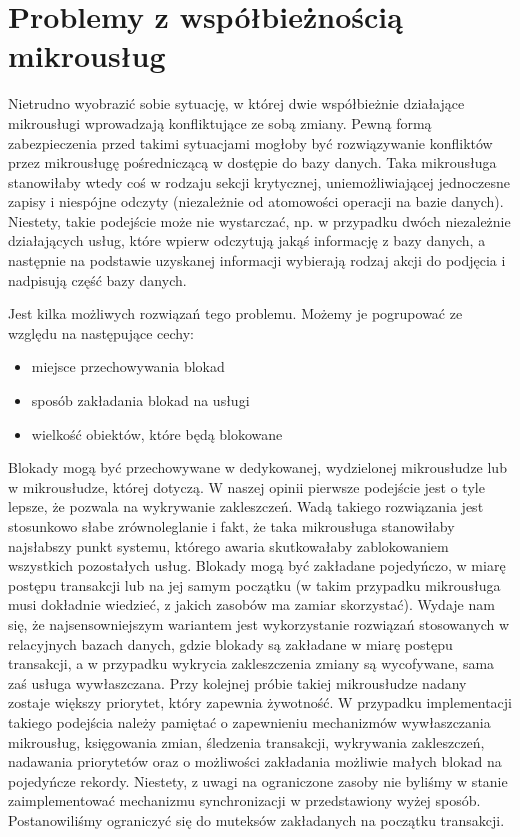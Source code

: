 \documentclass[licencjacka]{pracamgr}
\begin{document}
\section{Problemy z współbieżnością mikrousług}

Nietrudno wyobrazić sobie sytuację, w której dwie współbieżnie działające mikrousługi
wprowadzają konfliktujące ze sobą zmiany. Pewną formą zabezpieczenia przed takimi sytuacjami
mogłoby być rozwiązywanie konfliktów przez mikrousługę pośredniczącą w dostępie do bazy danych.
Taka mikrousługa stanowiłaby wtedy coś w rodzaju sekcji krytycznej, uniemożliwiającej jednoczesne zapisy
i niespójne odczyty (niezależnie od atomowości operacji na bazie danych). 
Niestety, takie podejście może nie wystarczać, np. w przypadku dwóch niezależnie działających usług, które wpierw
odczytują jakąś informację z bazy danych, a następnie na podstawie uzyskanej informacji wybierają rodzaj
akcji do podjęcia i nadpisują część bazy danych.

Jest kilka możliwych rozwiązań tego problemu. Możemy je pogrupować ze względu na następujące cechy:
\begin{itemize}
	\item miejsce przechowywania blokad
	\item sposób zakładania blokad na usługi
	\item wielkość obiektów, które będą blokowane
\end{itemize}
Blokady mogą być przechowywane w dedykowanej, wydzielonej mikrousłudze lub w mikrousłudze, której dotyczą. W naszej opinii
pierwsze podejście jest o tyle lepsze, że pozwala na wykrywanie zakleszczeń. Wadą takiego rozwiązania jest
stosunkowo słabe zrównoleglanie i fakt, że taka mikrousługa stanowiłaby najsłabszy punkt systemu, którego awaria
skutkowałaby zablokowaniem wszystkich pozostałych usług. Blokady mogą być zakładane pojedyńczo, w miarę
postępu transakcji lub na jej samym początku (w takim przypadku mikrousługa musi dokładnie wiedzieć, z jakich
zasobów ma zamiar skorzystać). Wydaje nam się, że najsensowniejszym wariantem jest wykorzystanie rozwiązań
stosowanych w relacyjnych bazach danych, gdzie blokady są zakładane w miarę postępu transakcji, a w przypadku
wykrycia zakleszczenia zmiany są wycofywane, sama zaś usługa wywłaszczana. Przy kolejnej próbie takiej mikrousłudze
nadany zostaje większy priorytet, który zapewnia żywotność. W przypadku implementacji takiego podejścia należy
pamiętać o zapewnieniu mechanizmów wywłaszczania mikrousług, księgowania zmian, śledzenia transakcji, wykrywania
zakleszczeń, nadawania priorytetów oraz o możliwości zakładania możliwie małych blokad na pojedyńcze rekordy.
Niestety, z uwagi na ograniczone zasoby nie byliśmy w stanie zaimplementować mechanizmu synchronizacji w
przedstawiony wyżej sposób. Postanowiliśmy ograniczyć się do muteksów zakładanych na początku transakcji.
\end{document}
